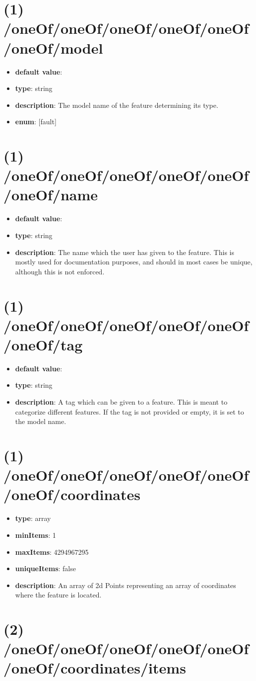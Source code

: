 \section{(1) /oneOf/oneOf/oneOf/oneOf/oneOf/oneOf/model}
\begin{itemize}[leftmargin=1em]\item {\bf default value}: 
\item {\bf type}: string
\item {\bf description}: The model name of the feature determining its type.
\item {\bf enum}: [fault]\end{itemize}\section{(1) /oneOf/oneOf/oneOf/oneOf/oneOf/oneOf/name}
\begin{itemize}[leftmargin=1em]\item {\bf default value}: 
\item {\bf type}: string
\item {\bf description}: The name which the user has given to the feature. This is mostly used for documentation purposes, and should in most cases be unique, although this is not enforced.
\end{itemize}\section{(1) /oneOf/oneOf/oneOf/oneOf/oneOf/oneOf/tag}
\begin{itemize}[leftmargin=1em]\item {\bf default value}: 
\item {\bf type}: string
\item {\bf description}: A tag which can be given to a feature. This is meant to categorize different features. If the tag is not provided or empty, it is set to the model name.
\end{itemize}\section{(1) /oneOf/oneOf/oneOf/oneOf/oneOf/oneOf/coordinates}
\begin{itemize}[leftmargin=1em]\item {\bf type}: array
\item {\bf minItems}: 1
\item {\bf maxItems}: 4294967295
\item {\bf uniqueItems}: false
\item {\bf description}: An array of 2d Points representing an array of coordinates where the feature is located.
\end{itemize}\section{(2) /oneOf/oneOf/oneOf/oneOf/oneOf/oneOf/coordinates/items}
